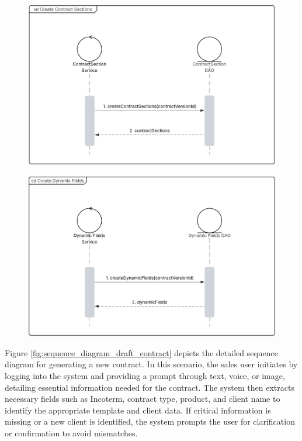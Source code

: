 \begin{figure}[H]
    \begin{minipage}[t]{0.48\textwidth}
        \centering
        \includegraphics[width=\textwidth]{Images/Sequence Diagram - Create Sections Ref.png}
        \label{fig:sequence_diagram_create_sections}
    \end{minipage}
    \hfill
    \begin{minipage}[t]{0.48\textwidth}
        \centering
        \includegraphics[width=\textwidth]{Images/Sequence Diagram - Create Dynamic Fields Ref.png}
        \label{fig:sequence_diagram_create_dynamic_fields}
    \end{minipage}

\end{figure}

Figure \ref{fig:sequence_diagram_draft_contract} depicts the detailed sequence diagram for generating a new contract. In this scenario, the sales user initiates by logging into the system and providing a prompt through text, voice, or image, detailing essential information needed for the contract. The system then extracts necessary fields such as Incoterm, contract type, product, and client name to identify the appropriate template and client data. If critical information is missing or a new client is identified, the system prompts the user for clarification or confirmation to avoid mismatches.\mynewline

